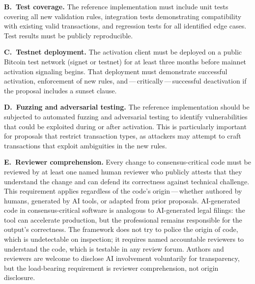 \documentclass[11pt, twoside, openright]{book}
\newcommand{\reqitem}[2]{\medskip\noindent\textbf{#1\ #2}\quad\ignorespaces}
\begin{document}
\reqitem{B.}{Test coverage.} The reference implementation must include unit tests covering all new validation rules, integration tests demonstrating compatibility with existing valid transactions, and regression tests for all identified edge cases. Test results must be publicly reproducible.

\reqitem{C.}{Testnet deployment.} The activation client must be deployed on a public Bitcoin test network (signet or testnet) for at least three months before mainnet activation signaling begins. That deployment must demonstrate successful activation, enforcement of new rules, and\,---\,critically\,---\,successful deactivation if the proposal includes a sunset clause.

\reqitem{D.}{Fuzzing and adversarial testing.} The reference implementation should be subjected to automated fuzzing and adversarial testing to identify vulnerabilities that could be exploited during or after activation. This is particularly important for proposals that restrict transaction types, as attackers may attempt to craft transactions that exploit ambiguities in the new rules.

\reqitem{E.}{Reviewer comprehension.} Every change to consensus-critical code must be reviewed by at least one named human reviewer who publicly attests that they understand the change and can defend its correctness against technical challenge. This requirement applies regardless of the code's origin\,---\,whether authored by humans, generated by AI tools, or adapted from prior proposals. AI-generated code in consensus-critical software is analogous to AI-generated legal filings: the tool can accelerate production, but the professional remains responsible for the output's correctness. The framework does not try to police the origin of code, which is undetectable on inspection; it requires named accountable reviewers to understand the code, which is testable in any review forum. Authors and reviewers are welcome to disclose AI involvement voluntarily for transparency, but the load-bearing requirement is reviewer comprehension, not origin disclosure.
\end{document}
